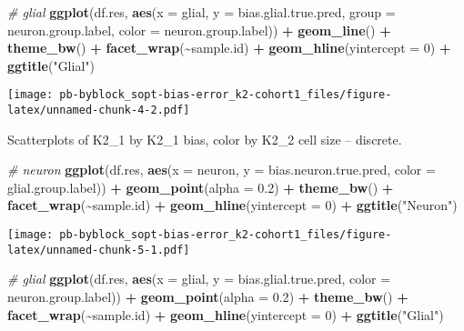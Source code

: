 \documentclass[
]{article}
\newenvironment{Shaded}{\begin{snugshade}}{\end{snugshade}}
\newcommand{\AttributeTok}[1]{\textcolor[rgb]{0.13,0.29,0.53}{#1}}
\newcommand{\CommentTok}[1]{\textcolor[rgb]{0.56,0.35,0.01}{\textit{#1}}}
\newcommand{\DecValTok}[1]{\textcolor[rgb]{0.00,0.00,0.81}{#1}}
\newcommand{\FloatTok}[1]{\textcolor[rgb]{0.00,0.00,0.81}{#1}}
\newcommand{\FunctionTok}[1]{\textcolor[rgb]{0.13,0.29,0.53}{\textbf{#1}}}
\newcommand{\NormalTok}[1]{#1}
\newcommand{\SpecialCharTok}[1]{\textcolor[rgb]{0.81,0.36,0.00}{\textbf{#1}}}
\newcommand{\StringTok}[1]{\textcolor[rgb]{0.31,0.60,0.02}{#1}}
\begin{document}
\begin{Shaded}
\begin{Highlighting}[]
\CommentTok{\# glial}
\FunctionTok{ggplot}\NormalTok{(df.res, }\FunctionTok{aes}\NormalTok{(}\AttributeTok{x =}\NormalTok{ glial, }\AttributeTok{y =}\NormalTok{ bias.glial.true.pred, }
                   \AttributeTok{group =}\NormalTok{ neuron.group.label, }\AttributeTok{color =}\NormalTok{ neuron.group.label)) }\SpecialCharTok{+} 
  \FunctionTok{geom\_line}\NormalTok{() }\SpecialCharTok{+} \FunctionTok{theme\_bw}\NormalTok{() }\SpecialCharTok{+} \FunctionTok{facet\_wrap}\NormalTok{(}\SpecialCharTok{\textasciitilde{}}\NormalTok{sample.id) }\SpecialCharTok{+} \FunctionTok{geom\_hline}\NormalTok{(}\AttributeTok{yintercept =} \DecValTok{0}\NormalTok{) }\SpecialCharTok{+}
  \FunctionTok{ggtitle}\NormalTok{(}\StringTok{"Glial"}\NormalTok{)}
\end{Highlighting}
\end{Shaded}

\texttt{[image: pb-byblock\_sopt-bias-error\_k2-cohort1\_files/figure-latex/unnamed-chunk-4-2.pdf]}

Scatterplots of K2\_1 by K2\_1 bias, color by K2\_2 cell size --
discrete.

\begin{Shaded}
\begin{Highlighting}[]
\CommentTok{\# neuron}
\FunctionTok{ggplot}\NormalTok{(df.res, }\FunctionTok{aes}\NormalTok{(}\AttributeTok{x =}\NormalTok{ neuron, }\AttributeTok{y =}\NormalTok{ bias.neuron.true.pred, }\AttributeTok{color =}\NormalTok{ glial.group.label)) }\SpecialCharTok{+} 
  \FunctionTok{geom\_point}\NormalTok{(}\AttributeTok{alpha =} \FloatTok{0.2}\NormalTok{) }\SpecialCharTok{+} \FunctionTok{theme\_bw}\NormalTok{() }\SpecialCharTok{+} \FunctionTok{facet\_wrap}\NormalTok{(}\SpecialCharTok{\textasciitilde{}}\NormalTok{sample.id) }\SpecialCharTok{+} \FunctionTok{geom\_hline}\NormalTok{(}\AttributeTok{yintercept =} \DecValTok{0}\NormalTok{) }\SpecialCharTok{+}
  \FunctionTok{ggtitle}\NormalTok{(}\StringTok{"Neuron"}\NormalTok{)}
\end{Highlighting}
\end{Shaded}

\texttt{[image: pb-byblock\_sopt-bias-error\_k2-cohort1\_files/figure-latex/unnamed-chunk-5-1.pdf]}

\begin{Shaded}
\begin{Highlighting}[]
\CommentTok{\# glial}
\FunctionTok{ggplot}\NormalTok{(df.res, }\FunctionTok{aes}\NormalTok{(}\AttributeTok{x =}\NormalTok{ glial, }\AttributeTok{y =}\NormalTok{ bias.glial.true.pred, }\AttributeTok{color =}\NormalTok{ neuron.group.label)) }\SpecialCharTok{+} 
  \FunctionTok{geom\_point}\NormalTok{(}\AttributeTok{alpha =} \FloatTok{0.2}\NormalTok{) }\SpecialCharTok{+} \FunctionTok{theme\_bw}\NormalTok{() }\SpecialCharTok{+} \FunctionTok{facet\_wrap}\NormalTok{(}\SpecialCharTok{\textasciitilde{}}\NormalTok{sample.id) }\SpecialCharTok{+} \FunctionTok{geom\_hline}\NormalTok{(}\AttributeTok{yintercept =} \DecValTok{0}\NormalTok{) }\SpecialCharTok{+}
  \FunctionTok{ggtitle}\NormalTok{(}\StringTok{"Glial"}\NormalTok{)}
\end{Highlighting}
\end{Shaded}
\end{document}
